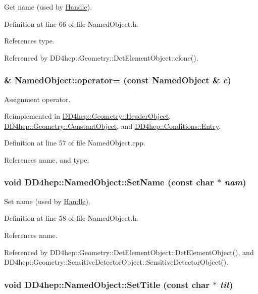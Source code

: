 Get name (used by \hyperlink{class_d_d4hep_1_1_handle}{Handle}). 

Definition at line 66 of file NamedObject.h.

References type.

Referenced by DD4hep::Geometry::DetElementObject::clone().\hypertarget{class_d_d4hep_1_1_named_object_a474ed41e8d8b480401671dfe07b33eb6}{
\subsubsection[{operator=}]{ \& NamedObject::operator= (const {\bf NamedObject} \& {\em c})}}
\label{class_d_d4hep_1_1_named_object_a474ed41e8d8b480401671dfe07b33eb6}


Assignment operator. 

Reimplemented in \hyperlink{class_d_d4hep_1_1_geometry_1_1_header_object_aa577cb624bf183b4ac62e22554f069f1}{DD4hep::Geometry::HeaderObject}, \hyperlink{class_d_d4hep_1_1_geometry_1_1_constant_object_acd8082f3aab755887e4bb77f1b730cf3}{DD4hep::Geometry::ConstantObject}, and \hyperlink{class_d_d4hep_1_1_conditions_1_1_entry_a750c6f836c0cb9a0bb6975a8f1e9ee01}{DD4hep::Conditions::Entry}.

Definition at line 57 of file NamedObject.cpp.

References name, and type.\hypertarget{class_d_d4hep_1_1_named_object_ae797352ed4559f085e6333b6394fb8ac}{
\subsubsection[{SetName}]{\setlength{\rightskip}{0pt plus 5cm}void DD4hep::NamedObject::SetName (const char $\ast$ {\em nam})}}
\label{class_d_d4hep_1_1_named_object_ae797352ed4559f085e6333b6394fb8ac}


Set name (used by \hyperlink{class_d_d4hep_1_1_handle}{Handle}). 

Definition at line 58 of file NamedObject.h.

References name.

Referenced by DD4hep::Geometry::DetElementObject::DetElementObject(), and DD4hep::Geometry::SensitiveDetectorObject::SensitiveDetectorObject().\hypertarget{class_d_d4hep_1_1_named_object_ac0ca31db35ec2162134e5a9b92e8a0d6}{
\subsubsection[{SetTitle}]{\setlength{\rightskip}{0pt plus 5cm}void DD4hep::NamedObject::SetTitle (const char $\ast$ {\em tit})}}
\label{class_d_d4hep_1_1_named_object_ac0ca31db35ec2162134e5a9b92e8a0d6}


